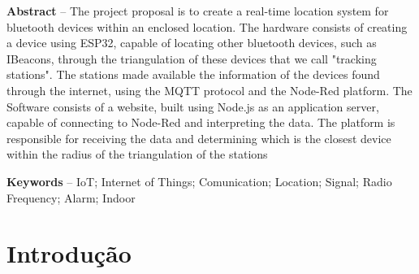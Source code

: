 \documentclass[
	article,			%
	12pt,				%
	oneside,			%
	a4paper,			%
	english,			%
	brazil,				%
	sumario=tradicional
	]{abntex2}
\begin{document}
\begin{changemargin}{1cm}{1cm} 
\textbf{Abstract} – The project proposal is to create a real-time location system for bluetooth devices within an enclosed location. The hardware consists of creating a device using ESP32, capable of locating other bluetooth devices, such as IBeacons, through the triangulation of these devices that we call "tracking stations". The stations made available the information of the devices found through the internet, using the MQTT protocol and the Node-Red platform. The Software consists of a website, built using Node.js as an application server, capable of connecting to Node-Red and interpreting the data. The platform is responsible for receiving the data and determining which is the closest device within the radius of the triangulation of the stations
\vspace{\onelineskip}
	
\noindent
\textbf{Keywords} – IoT; Internet of Things; Comunication; Location; Signal; Radio Frequency; Alarm; Indoor 
\end{changemargin}
   

\section{Introdução}

\let\thefootnote\svthefootnote
\end{document}
